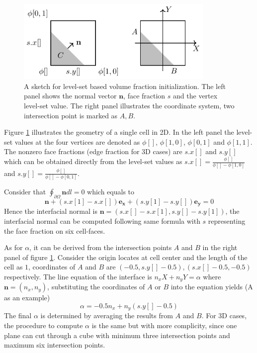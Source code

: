 \begin{figure}[H]
  \centering
  \includegraphics[height=4cm]{./image/fractions-h/normal.pdf}
  \caption{A sketch for level-set based volume fraction initialization. The left panel shows the normal vector $\mathbf{n}$, face fraction $s$ and the vertex level-set value. The right panel illustrates the coordinate system, two intersection point is marked as $A,B$.}
  \label{fig:fractions-normal}
\end{figure}

Figure \ref{fig:fractions-normal} illustrates the geometry of a single cell in 2D. In the left panel the level-set values at the four vertices are denoted as $\phi[]$, $\phi[1,0]$, $\phi[0,1]$ and $\phi[1,1]$. The nonzero face fractions (edge fraction for 3D cases) are $s.x[]$ and $s.y[]$ which can be obtained directly from the level-set values as $s.x[] = \frac{\phi[]}{\phi[]-\phi[1,0]}$ and $s.y[] = \frac{\phi[]}{\phi[]-\phi[0,1]}$. 

Consider that $\oint_{\partial \Omega}\mathbf{n}dl = 0$ which equals to
\begin{equation}
  \mathbf{n} + (s.x[1]-s.x[])\mathbf{e_x} + (s.y[1]-s.y[])\mathbf{e_y} = 0
\end{equation}
Hence the interfacial normal is $\mathbf{n} = (s.x[]-s.x[1],s.y[]-s.y[1])$, the interfacial normal can be computed following same formula with $s$ representing the face fraction on six cell-faces. 

As for $\alpha$, it can be derived from the intersection points $A$ and $B$ in the right panel of figure \ref{fig:fractions-normal}. Consider the origin locates at cell center and the length of the cell as $1$, coordinates of $A$ and $B$ are $(-0.5,s.y[]-0.5),(s.x[]-0.5,-0.5)$ respectively. The line equation of the interface is $n_x X + n_y Y = \alpha$ where $\mathbf{n} = (n_x,n_y)$, substituting the coordinates of $A$ or $B$ into the equation yields (A as an example)
\begin{equation}  
  \alpha = -0.5n_x + n_y (s.y[]-0.5)
\end{equation}
The final $\alpha$ is determined by averaging the results from $A$ and $B$. For 3D cases, the procedure to compute $\alpha$ is the same but with more complicity, since one plane can cut through a cube with minimum three intersection points and maximum six intersection points.

